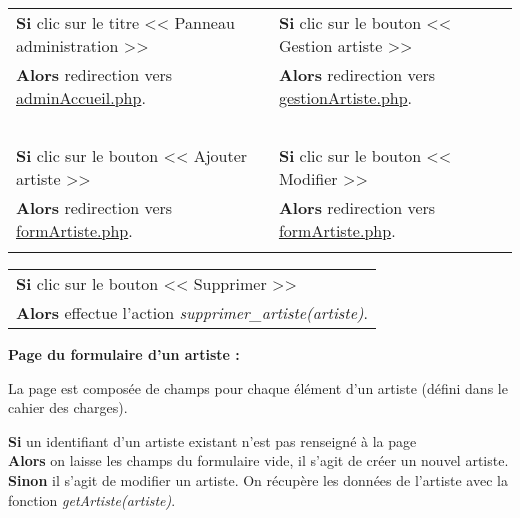             \begin{center}
                \begin{tabular}{l | l}
                    \textbf{Si} clic sur le titre << Panneau administration >> & \textbf{Si} clic sur le bouton << Gestion artiste >> \\
                    \textbf{Alors} redirection vers \underline{adminAccueil.php}. & \textbf{Alors} redirection vers \underline{gestionArtiste.php}. \\ \\

                    \textbf{Si} clic sur le bouton << Ajouter artiste >> & \textbf{Si} clic sur le bouton << Modifier >> \\
                    \textbf{Alors} redirection vers \underline{formArtiste.php}. & \textbf{Alors} redirection vers \underline{formArtiste.php}. \\ \\
                \end{tabular}

                \begin{tabular}{l}
                    \textbf{Si} clic sur le bouton << Supprimer >> \\
                    \textbf{Alors} effectue l'action \emph{supprimer\_artiste(artiste)}.
                \end{tabular}
            \end{center}
            
            
            \begin{paragraphe}
                \textbf{Page du formulaire d'un artiste :}
            \end{paragraphe}
            
            \begin{paragraphe}
                La page est composée de champs pour chaque élément d'un artiste (défini dans le cahier des charges).
            \end{paragraphe}

            \begin{paragraphe}
                \textbf{Si} un identifiant d'un artiste existant n'est pas renseigné à la page \\
                \textbf{Alors} on laisse les champs du formulaire vide, il s'agit de créer un nouvel artiste. \\
                \textbf{Sinon} il s'agit de modifier un artiste. On récupère les données de l'artiste avec la fonction \emph{getArtiste(artiste)}.
            \end{paragraphe}
            
